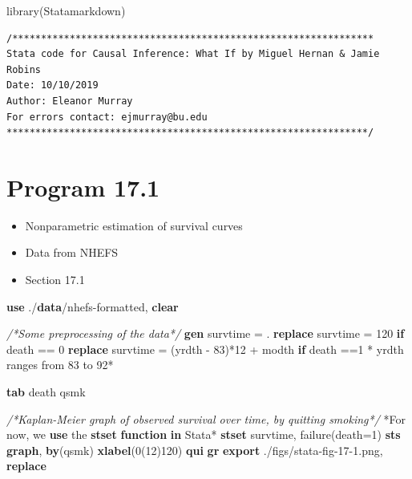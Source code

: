 \documentclass[
  10pt,
]{book}
\newenvironment{Shaded}{\begin{snugshade}}{\end{snugshade}}
\newcommand{\CommentTok}[1]{\textcolor[rgb]{0.56,0.35,0.01}{\textit{#1}}}
\newcommand{\FunctionTok}[1]{\textcolor[rgb]{0.00,0.00,0.00}{#1}}
\newcommand{\KeywordTok}[1]{\textcolor[rgb]{0.13,0.29,0.53}{\textbf{#1}}}
\newcommand{\NormalTok}[1]{#1}
\providecommand{\tightlist}{%
  \setlength{\itemsep}{0pt}\setlength{\parskip}{0pt}}
\begin{document}
\begin{Shaded}
\begin{Highlighting}[]
\FunctionTok{library}\NormalTok{(Statamarkdown)}
\end{Highlighting}
\end{Shaded}

\begin{verbatim}
/***************************************************************
Stata code for Causal Inference: What If by Miguel Hernan & Jamie Robins
Date: 10/10/2019
Author: Eleanor Murray 
For errors contact: ejmurray@bu.edu
***************************************************************/
\end{verbatim}

\hypertarget{program-17.1-1}{%
\section{Program 17.1}\label{program-17.1-1}}

\begin{itemize}
\tightlist
\item
  Nonparametric estimation of survival curves
\item
  Data from NHEFS
\item
  Section 17.1
\end{itemize}

\begin{Shaded}
\begin{Highlighting}[]
\KeywordTok{use}\NormalTok{ ./}\KeywordTok{data}\NormalTok{/nhefs{-}formatted, }\KeywordTok{clear}

\CommentTok{/*Some preprocessing of the data*/}
\KeywordTok{gen}\NormalTok{ survtime = .}
\KeywordTok{replace}\NormalTok{ survtime = 120 }\KeywordTok{if}\NormalTok{ death == 0}
\KeywordTok{replace}\NormalTok{ survtime = (yrdth {-} 83)*12 + modth }\KeywordTok{if}\NormalTok{ death ==1}
\NormalTok{* yrdth ranges from 83 to 92*}

\KeywordTok{tab}\NormalTok{ death qsmk}

\CommentTok{/*Kaplan{-}Meier graph of observed survival over time, by quitting smoking*/}
\NormalTok{*For now, we }\KeywordTok{use}\NormalTok{ the }\KeywordTok{stset} \KeywordTok{function} \KeywordTok{in}\NormalTok{ Stata*}
\KeywordTok{stset}\NormalTok{ survtime, failure(death=1)}
\KeywordTok{sts} \KeywordTok{graph}\NormalTok{, }\KeywordTok{by}\NormalTok{(qsmk) }\KeywordTok{xlabel}\NormalTok{(0(12)120)}
\KeywordTok{qui} \KeywordTok{gr} \KeywordTok{export}\NormalTok{ ./figs/stata{-}fig{-}17{-}1.png, }\KeywordTok{replace}
\end{Highlighting}
\end{Shaded}
\end{document}
